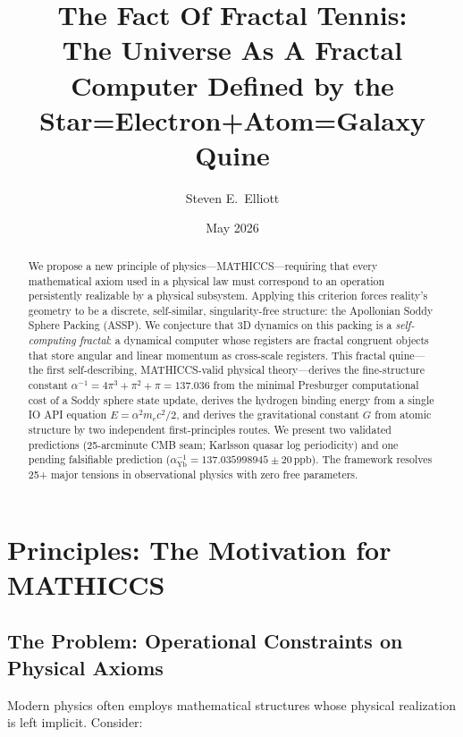 \documentclass[11pt,a4paper]{article}
\title{The Fact Of Fractal Tennis: \\
The Universe As A Fractal Computer Defined by the \\
Star=Electron+Atom=Galaxy Quine}
\author{Steven E.\ Elliott}
\date{May 2026}
\begin{document}
\maketitle

\begin{abstract}
  We propose a new principle of physics---MATHICCS---requiring that every mathematical axiom used in a physical law must correspond to an operation persistently realizable by a physical subsystem. Applying this criterion forces reality's geometry to be a discrete, self-similar, singularity-free structure: the Apollonian Soddy Sphere Packing (ASSP). We conjecture that 3D dynamics on this packing is a \emph{self-computing fractal}: a dynamical computer whose registers are fractal congruent objects that store angular and linear momentum as cross-scale registers. This fractal quine---the first self-describing, MATHICCS-valid physical theory---derives the fine-structure constant $\alpha^{-1} = 4\pi^3+\pi^2+\pi = 137.036$ from the minimal Presburger computational cost of a Soddy sphere state update, derives the hydrogen binding energy from a single IO API equation $E = \alpha^2 m_e c^2/2$, and derives the gravitational constant $G$ from atomic structure by two independent first-principles routes. We present two validated predictions (25-arcminute CMB seam; Karlsson quasar log periodicity) and one pending falsifiable prediction ($\alpha^{-1}_{\mathrm{Yb}} = 137.035998945 \pm 20\,\mathrm{ppb}$). The framework resolves 25+ major tensions in observational physics with zero free parameters.
\end{abstract}


\section{Principles: The Motivation for MATHICCS}

\subsection{The Problem: Operational Constraints on Physical Axioms}

Modern physics often employs mathematical structures whose physical realization is left implicit. Consider:
\end{document}
